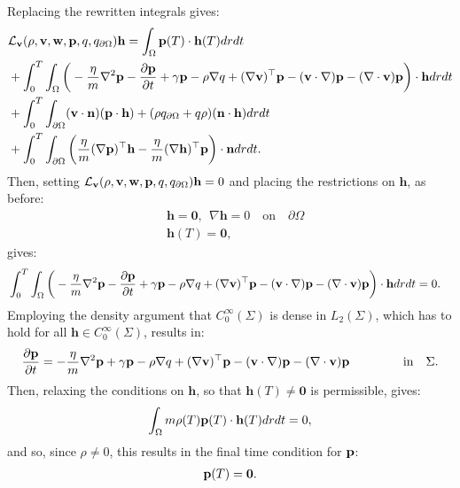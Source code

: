Replacing the rewritten integrals gives:
\begin{align*}
&\mathcal{L}_{\mathbf{v}}(\rho,\mathbf{v},\mathbf{w},\mathbf{p},q,{q}_{\partial \Omega}) \mathbf{h} = \int_\Omega\mathbf{p}(T) \cdot \mathbf{h}(T) dr dt\\
&+\int_0^T \int_\Omega 
\bigg( - \frac{\eta}{m} \nabla^2 \mathbf{p} -   \frac{\partial \mathbf{p}}{\partial t} + \gamma\mathbf{p}-\rho\nabla q +(\nabla \mathbf{v})^\top\mathbf{p} 
- (\mathbf{v} \cdot \nabla)\mathbf{p} -  (\nabla \cdot \mathbf{v})\mathbf{p}   \bigg)\cdot  \mathbf{h} drdt\\
& +\int_0^T \int_{\partial\Omega} (\mathbf{v} \cdot \mathbf{n})(\mathbf{p} \cdot \mathbf{h}) +(\rho  {q}_{\partial \Omega} + q \rho)  (\mathbf{n}\cdot \mathbf{h}) dr dt \\
&+ \int_0^T \int_{\partial \Omega}  \bigg( \frac{\eta}{m}  (\nabla \mathbf{p})^\top \mathbf{h}  - \frac{\eta}{m}(\nabla \mathbf{h})^\top \mathbf{p} \bigg) \cdot \mathbf{n} dr dt.
\end{align*}
Then, setting $\mathcal{L}_{\mathbf{v}}(\rho,\mathbf{v},\mathbf{w},\mathbf{p},q,{q}_{\partial \Omega}) \mathbf{h}={0}$ and placing the restrictions on $\mathbf{h}$, as before:
\begin{align*}
&\mathbf{h}=\mathbf{0}, \ \ \nabla \mathbf{h} = 0 \quad \text{on} \quad \partial \Omega\\
&\mathbf{h}(T)=\mathbf{0},
\end{align*}
gives:
\begin{align*}
&\int_0^T \int_\Omega 
\bigg( - \frac{\eta}{m} \nabla^2 \mathbf{p} -   \frac{\partial \mathbf{p}}{\partial t} + \gamma\mathbf{p}-\rho\nabla q +(\nabla \mathbf{v})^\top\mathbf{p} 
- (\mathbf{v} \cdot \nabla)\mathbf{p} -  (\nabla \cdot \mathbf{v})\mathbf{p}    \bigg)\cdot  \mathbf{h} drdt = 0.
\end{align*}
Employing the density argument that $C_0^\infty(\Sigma)$ is dense in $L_2(\Sigma)$, which has to hold for all $\mathbf{h}\in C_0^\infty(\Sigma)$, results in:
\begin{align*}
   \frac{\partial \mathbf{p}}{\partial t} =  - \frac{\eta}{m} \nabla^2 \mathbf{p}  + \gamma\mathbf{p}-\rho\nabla q +(\nabla \mathbf{v})^\top\mathbf{p} 
- (\mathbf{v} \cdot \nabla)\mathbf{p} -  (\nabla \cdot \mathbf{v})\mathbf{p}     \ \qquad\qquad \text{in} \quad \Sigma.
\end{align*}
Then, relaxing the conditions on $\mathbf{h}$, so that $\mathbf{h}(T) \neq \mathbf{0} $ is permissible, gives:
\begin{align*}
 \int_\Omega m \rho(T) \mathbf{p}(T) \cdot \mathbf{h}(T) dr dt=0,
\end{align*}
and so, since $\rho \neq 0$, this results in the final time condition for $\mathbf{p}$:
\begin{align}
\mathbf{p}(T)=\mathbf{0}.
\end{align}
